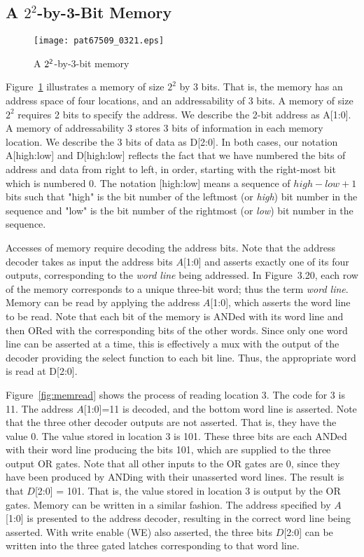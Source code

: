 \documentclass{patt}
\begin{document}
\subsection{A $2^2$-by-3-Bit Memory}

\begin{figure}[b]
\centerline{\texttt{[image: pat67509\_0321.eps]}}
\caption{A $2^{\sf 2}$-by-3-bit memory}
\label{fig:memory}
\vspace{-6pt}
\end{figure}

Figure~\ref{fig:memory} illustrates a memory of size $2^2$ by 3 bits.  That is,
the memory has an address space of four locations, and an addressability 
of 3 bits.  A memory of size $2^2$ requires 2 bits to specify the address. 
We describe the 2-bit address as A[1:0].  A memory of addressability 3 stores 
3 bits of information in each memory location.  We describe the 3 bits of data 
as D[2:0].  In both cases, our notation A[high:low] and D[high:low] reflects 
the fact that we have numbered the bits of address 
and data from right to left, in order, starting with the right-most bit which 
is numbered 0.  The notation [high:low] means a sequence of $high - low + 1$ 
bits such that "high" is the bit number of the leftmost (or {\em high}) bit 
number in the sequence and "low" is the bit number of the rightmost 
(or {\em low}) bit number in the sequence.  

Accesses of memory require
decoding the address bits.  Note that the address decoder takes as
input the address bits $A$[1:0] and asserts exactly one of its four outputs,
corresponding to the {\em word line} being addressed.  In Figure~3.20,
each row of the memory corresponds to a unique three-bit word; thus
the term {\em word line}.  Memory can be read by applying the address
$A$[1:0], which asserts the word line to be read.  Note that each bit
of the memory is ANDed with its word line and then ORed with the
corresponding bits of the other words.  Since only one word line can
be asserted at a time, this is effectively a mux with the output of
the decoder providing the select function to each bit line.  Thus, the
appropriate word is read at D[2:0].

Figure~\ref{fig:memread} shows the process of reading location 3.  
The code for 3
is 11.  The address $A$[1:0]=11 is decoded, and the bottom word line
is asserted.  Note that the three other decoder outputs are not
asserted.  That is, they have the value 0.  The value stored in
location 3 is 101.  These three bits are each ANDed with their word
line producing the bits 101, which are supplied to the three output OR
gates.  Note that all other inputs to the OR gates are 0, since they
have been produced by ANDing with their unasserted word lines.  The result
is that $D$[2:0] = 101.  That is, the value stored in location 3 is
output by the OR gates. Memory can be written in a similar fashion.
The address specified by $A$[1:0] is presented to the address decoder,
resulting in the correct word line being asserted.  With write enable (WE) 
also asserted, the three bits $D$[2:0] can be written into the three gated
latches corresponding to that word line.
\end{document}
